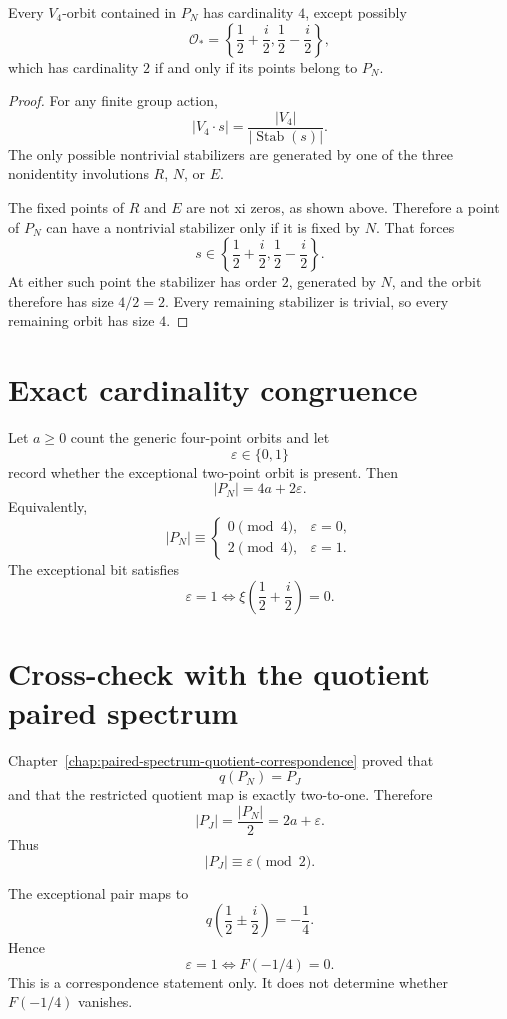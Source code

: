 \begin{theorem}
Every $V_4$-orbit contained in $P_N$ has cardinality $4$, except possibly
\[
 \mathcal O_*
 =\left\{\frac12+\frac i2,\frac12-\frac i2\right\},
\]
which has cardinality $2$ if and only if its points belong to $P_N$.
\end{theorem}

\begin{proof}
For any finite group action,
\[
 |V_4\cdot s|=\frac{|V_4|}{|\operatorname{Stab}(s)|}.
\]
The only possible nontrivial stabilizers are generated by one of the three nonidentity involutions $R$, $N$, or $E$.

The fixed points of $R$ and $E$ are not xi zeros, as shown above.  Therefore a point of $P_N$ can have a nontrivial stabilizer only if it is fixed by $N$.  That forces
\[
 s\in\left\{\frac12+\frac i2,\frac12-\frac i2\right\}.
\]
At either such point the stabilizer has order $2$, generated by $N$, and the orbit therefore has size $4/2=2$.  Every remaining stabilizer is trivial, so every remaining orbit has size $4$.
\end{proof}

\section{Exact cardinality congruence}

Let $a\ge0$ count the generic four-point orbits and let
\[
 \varepsilon\in\{0,1\}
\]
record whether the exceptional two-point orbit is present.  Then
\[
 \boxed{|P_N|=4a+2\varepsilon}.
\]
Equivalently,
\[
 |P_N|\equiv
 \begin{cases}
 0\pmod4,&\varepsilon=0,\\
 2\pmod4,&\varepsilon=1.
 \end{cases}
\]
The exceptional bit satisfies
\[
 \varepsilon=1
 \iff
 \xi\!\left(\frac12+\frac i2\right)=0.
\]

\section{Cross-check with the quotient paired spectrum}

Chapter~\ref{chap:paired-spectrum-quotient-correspondence} proved that
\[
 q(P_N)=P_J
\]
and that the restricted quotient map is exactly two-to-one.  Therefore
\[
 |P_J|=\frac{|P_N|}{2}=2a+\varepsilon.
\]
Thus
\[
 \boxed{|P_J|\equiv\varepsilon\pmod2}.
\]

The exceptional pair maps to
\[
 q\!\left(\frac12\pm\frac i2\right)
 =-\frac14.
\]
Hence
\[
 \varepsilon=1
 \iff
 F(-1/4)=0.
\]
This is a correspondence statement only.  It does not determine whether $F(-1/4)$ vanishes.

